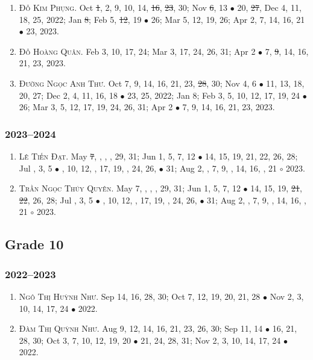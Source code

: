 \documentclass{article}
\begin{document}
\begin{enumerate}
	\item \textsc{Đỗ Kim Phụng.} {\sf[In]} Oct \st{1}, 2, 9, 10, 14, \st{16}, \st{23}, 30; Nov \st{6}, 13 $\bullet$ 20, \st{27}, Dec 4, 11, 18, 25, 2022; Jan \st{8}; Feb 5, \st{12}, 19 $\bullet$ 26; Mar 5, 12, 19, 26; Apr 2, 7, 14, 16, 21 $\bullet$ 23, 2023.
	\item \textsc{Đỗ Hoàng Quân.} {\sf[In]} Feb 3, 10, 17, 24; Mar 3, 17, 24, 26, 31; Apr 2 $\bullet$ 7, \st{9}, 14, 16, 21, 23, 2023.
	\item \textsc{Đường Ngọc Anh Thư.} {\sf[In]} Oct 7, 9, 14, 16, 21, 23, \st{28}, 30; Nov 4, 6 $\bullet$ 11, 13, 18, 20, 27; Dec 2, 4, 11, 16, 18 $\bullet$ 23, 25, 2022; Jan 8; Feb 3, 5, 10, 12, 17, 19, 24 $\bullet$ 26; Mar 3, 5, 12, 17, 19, 24, 26, 31; Apr 2 $\bullet$ 7, 9, 14, 16, 21, 23, 2023.
\end{enumerate}

\subsubsection{2023--2024}

\begin{enumerate}
	\item \textsc{Lê Tiến Đạt.} May \st{7}, , , , 29, 31; Jun 1, 5, 7, 12 $\bullet$ 14, 15, 19, 21, 22, 26, 28; Jul , 3, 5 $\bullet$ , 10, 12, , 17, 19, , 24, 26,  $\bullet$ 31; Aug 2, , 7, 9, , 14, 16, , 21 $\circ$ 2023.
	\item \textsc{Trần Ngọc Thúy Quyên.} May 7, , , , 29, 31; Jun 1, 5, 7, 12 $\bullet$ 14, 15, 19, \st{21}, \st{22}, 26, 28; Jul , 3, 5 $\bullet$ , 10, 12, , 17, 19, , 24, 26,  $\bullet$ 31; Aug 2, , 7, 9, , 14, 16, , 21 $\circ$ 2023.
\end{enumerate}


\subsection{Grade 10}

\subsubsection{2022--2023}

\begin{enumerate}
	\item \textsc{Ngô Thị Huỳnh Như.} {\sf[In]} Sep 14, 16, 28, 30; Oct 7, 12, 19, 20, 21, 28 $\bullet$ Nov 2, 3, 10, 14, 17, 24 $\bullet$ 2022. {\sf[Out]}
	\item \textsc{Đàm Thị Quỳnh Như.} {\sf[In]} Aug 9, 12, 14, 16, 21, 23, 26, 30; Sep 11, 14 $\bullet$ 16, 21, 28, 30; Oct 3, 7, 10, 12, 19, 20 $\bullet$ 21, 24, 28, 31; Nov 2, 3, 10, 14, 17, 24 $\bullet$ 2022. {\sf[Out]}
\end{enumerate}
\end{document}
